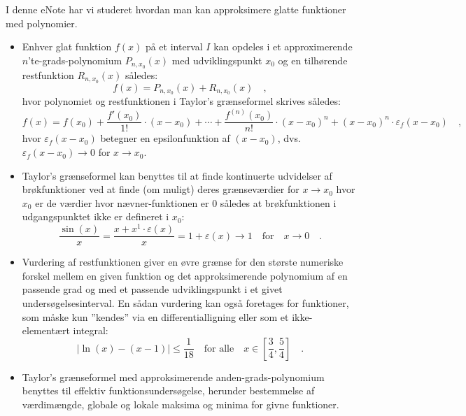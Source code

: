 \begin{summary}
I denne eNote har vi studeret hvordan man kan approksimere glatte funktioner med polynomier.
\begin{itemize}
\item Enhver glat funktion $f(x)$ på et interval $I$ kan opdeles i et approximerende $n$'te-grads-polynomium $P_{n, x_{0}}(x)$ med udviklingspunkt $x_{0}$ og en tilhørende restfunktion $R_{n, x_{0}}(x)$ således:
    \begin{equation}
  f(x) = P_{n, x_{0}}(x) + R_{n, x_{0}}(x) \quad ,
    \end{equation}
hvor polynomiet og restfunktionen i Taylor's grænseformel skrives således:
\begin{equation*}
f(x) = f(x_{0}) + \frac{f'(x_{0})}{1!}\cdot(x-x_{0}) + \cdots +
\frac{f^{(n)}(x_{0})}{n!}\cdot(x-x_{0})^{n} + (x-x_{0})^{n}\cdot\varepsilon_{f}(x-x_{0}) \quad ,
\end{equation*}
hvor $\varepsilon_{f}(x-x_{0})$ betegner en epsilonfunktion af $(x-x_{0})$, dvs. $\varepsilon_{f}(x-x_{0}) \to 0 $ for $x \to x_{0}$.
\item Taylor's grænseformel kan benyttes til at finde kontinuerte udvidelser af brøk\-funk\-tioner ved at finde (om muligt) deres grænseværdier for $x \to x_{0}$ hvor $x_{0}$ er de værdier hvor nævner-funktionen er $0$ således at brøkfunktionen i udgangspunktet ikke er defineret i $x_{0}$:
\begin{equation}
\frac{\sin(x)}{x} = \frac{x + x^{1}\cdot\varepsilon(x)}{x} = 1 + \varepsilon(x) \to 1 \quad \textrm{for} \quad x \to 0 \quad .
\end{equation}

\item Vurdering af restfunktionen giver en øvre grænse for den største numeriske forskel mellem en given funktion og det approksimerende polynomium af en  passende grad
og med et passende udviklingspunkt i et givet undersøgelsesinterval. En sådan vurdering  kan også foretages for funktioner, som måske kun ''kendes'' via en differentialligning eller som et ikke-elementært integral:
\begin{equation}
|\ln(x) - (x-1)| \leq \frac{1}{18} \quad \textrm{for alle} \quad x \in \left[\frac{3}{4}, \frac{5}{4} \right] \quad .
\end{equation}

\item Taylor's grænseformel med approksimerende anden-grads-polynomium
benyt\-tes til effektiv funktionsundersøgelse, herunder bestemmelse af værdimængde, globale og lokale maksima og minima for givne funktioner.
\end{itemize}
\end{summary}






